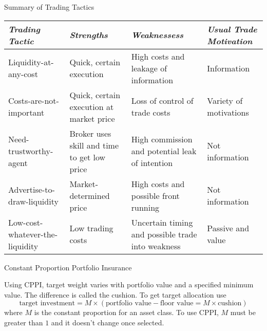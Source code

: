 \documentclass[../custom]{flashcards}
\begin{document}
\begin{flashcard}[\studyArea]{Summary of Trading Tactics}
    \begin{tabular}
        {>{\raggedright}p{1.05in}
         >{\raggedright}p{1.05in}
         >{\raggedright}p{1.05in}
         >{\raggedright\arraybackslash}p{1.05in}}
        \toprule

        \textit{Trading Tactic} &
        \textit{Strengths} &
        \textit{Weaknessess} &
        \textit{Usual Trade Motivation}\\ \midrule

        Liquidity-at-any-cost &
        Quick, certain execution &
        High costs and leakage of information &
        Information\\ \addlinespace

        Costs-are-not-important &
        Quick, certain execution at market price &
        Loss of control of trade costs &
        Variety of motivations\\ \addlinespace

        Need-trustworthy-agent &
        Broker uses skill and time to get low price &
        High commission and potential leak of intention &
        Not information\\ \addlinespace

        Advertise-to-draw-liquidity &
        Market-determined price &
        High costs and possible front running &
        Not information\\ \addlinespace

        Low-cost-whatever-the-liquidity &
        Low trading costs &
        Uncertain timing and possible trade into weakness&
        Passive and value\\ \bottomrule
    \end{tabular}
\end{flashcard}

\begin{flashcard}[\studyArea]{Constant Proportion Portfolio Insurance}
    \begin{flushleft}
        Using CPPI, target weight varies with portfolio value and a specified minimum value. The difference is called the cushion. To get target allocation use
        \[
            \text{target investment} = M \times (\text{portfolio value} - \text{floor value} = M \times \text{cushion})
        \]
        where $M$ is the constant proportion for an asset class. To use CPPI, $M$ must be greater than $1$ and it doesn't change once selected.
    \end{flushleft}
\end{flashcard}
\end{document}
